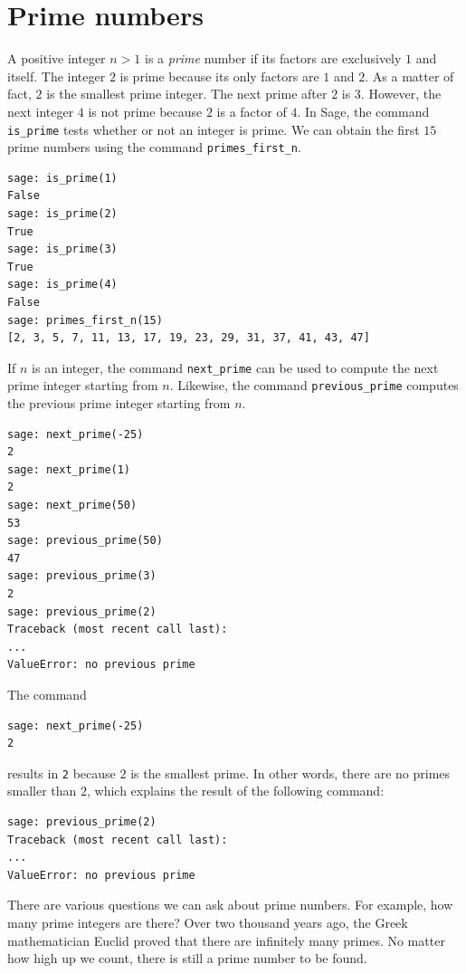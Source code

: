 
\section{Prime numbers}

A positive integer $n > 1$ is a \emph{prime} number if
its factors are exclusively $1$ and itself. The integer $2$ is prime
because its only factors are $1$ and $2$. As a matter of fact, $2$ is
the smallest prime integer. The next prime after $2$ is $3$. However,
the next integer $4$ is not prime because $2$ is a factor of $4$. In
Sage, the command \verb!is_prime! tests whether or not an integer is
prime. We can obtain the first $15$ prime numbers using the command
\verb!primes_first_n!.

\begin{lstlisting}
sage: is_prime(1)
False
sage: is_prime(2)
True
sage: is_prime(3)
True
sage: is_prime(4)
False
sage: primes_first_n(15)
[2, 3, 5, 7, 11, 13, 17, 19, 23, 29, 31, 37, 41, 43, 47]
\end{lstlisting}

If $n$ is an integer, the command \verb!next_prime! can be used to
compute the next prime integer starting from $n$. Likewise, the command
\verb!previous_prime! computes the previous prime integer starting
from $n$.
%
\begin{lstlisting}
sage: next_prime(-25)
2
sage: next_prime(1)
2
sage: next_prime(50)
53
sage: previous_prime(50)
47
sage: previous_prime(3)
2
sage: previous_prime(2)
Traceback (most recent call last):
...
ValueError: no previous prime
\end{lstlisting}
%
The command
%
\begin{lstlisting}
sage: next_prime(-25)
2
\end{lstlisting}
%
results in \verb!2! because $2$ is the smallest prime. In other words,
there are no primes smaller than $2$, which explains the result of the
following command:
%
\begin{lstlisting}
sage: previous_prime(2)
Traceback (most recent call last):
...
ValueError: no previous prime
\end{lstlisting}

There are various questions we can ask about prime
numbers. For example, how many prime integers are there? Over two
thousand years ago, the Greek mathematician Euclid
proved that there are infinitely many primes. No matter how high up we
count, there is still a prime number to be found.

